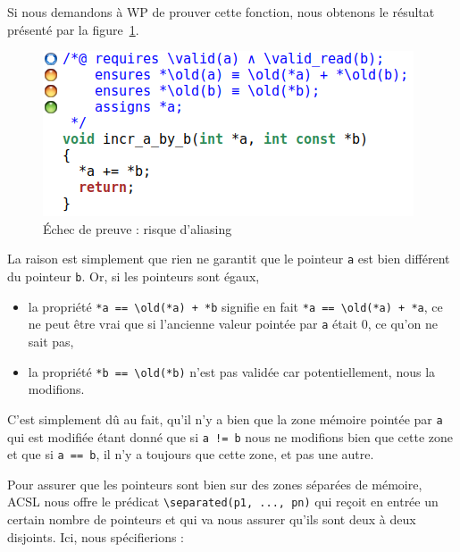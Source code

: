 \documentclass[12pt,francais,]{scrbook}
\providecommand{\tightlist}{%
  \setlength{\itemsep}{0pt}\setlength{\parskip}{0pt}}
\newenvironment{zdsexampleblock}[1]{%
  \tcolorbox[beamer,%
    noparskip,breakable,
    colback=LightGreen,colframe=DarkGreen,%
    colbacklower=LimeGreen,%
    title=#1]
}{\endtcolorbox}
\begin{document}
Si nous demandons à WP de prouver cette fonction, nous obtenons le
résultat présenté par la figure~\ref{fig:2-2-2-incr_a_by_b-1}.

\begin{figure}[htbp]
\centering
\includegraphics[scale=0.5]{2-2-2-incr_a_by_b-1.png}
\caption{Échec de preuve : risque d'aliasing}
\label{fig:2-2-2-incr_a_by_b-1}
\end{figure}

La raison est simplement que rien ne garantit que le pointeur \texttt{a}
est bien différent du pointeur \texttt{b}. Or, si les pointeurs sont
égaux,

\begin{itemize}
\tightlist
\item
  la propriété \texttt{*a\ ==\ \textbackslash{}old(*a)\ +\ *b} signifie
  en fait \texttt{*a\ ==\ \textbackslash{}old(*a)\ +\ *a}, ce ne peut
  être vrai que si l'ancienne valeur pointée par \texttt{a} était 0, ce
  qu'on ne sait pas,
\item
  la propriété \texttt{*b\ ==\ \textbackslash{}old(*b)} n'est pas
  validée car potentiellement, nous la modifions.
\end{itemize}

\begin{zdsexampleblock}{Pourquoi la clause assign est-elle validée ?}
  C'est simplement dû au fait, qu'il n'y a
  bien que la zone mémoire pointée par \texttt{a} qui est
  modifiée étant donné que si \texttt{a\ !=\ b} nous ne modifions bien
  que cette zone et que si \texttt{a\ ==\ b}, il n'y a toujours
  que cette zone, et pas une autre.
\end{zdsexampleblock}

Pour assurer que les pointeurs sont bien sur des zones séparées de
mémoire, ACSL nous offre le prédicat
\texttt{\textbackslash{}separated(p1,\ ...,\ pn)} qui reçoit en entrée
un certain nombre de pointeurs et qui va nous assurer qu'ils sont deux à
deux disjoints. Ici, nous spécifierions :
\end{document}
